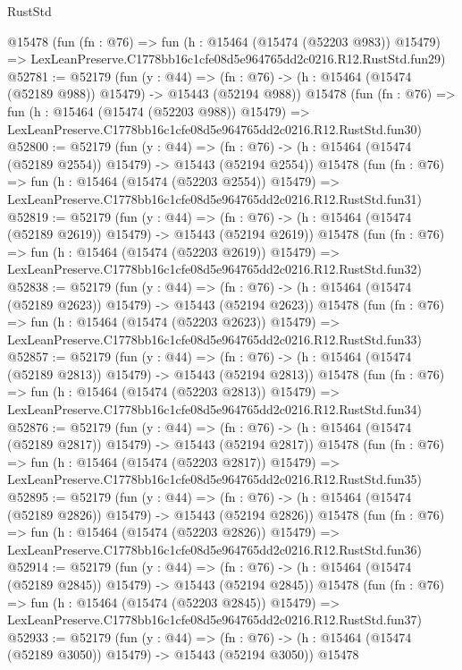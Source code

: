 \begin{lexlean}{RustStd}
\begin{coremodule}
    @15478
    (fun (fn : @76) =>
    fun (h : @15464 (@15474 (@52203 @983)) @15479) =>
    LexLeanPreserve.C1778bb16c1cfe08d5e964765dd2c0216.R12.RustStd.fun29)
@52781 := @52179
    (fun (y : @44) =>
    (fn : @76) -> (h : @15464 (@15474 (@52189 @988)) @15479) -> @15443 (@52194 @988))
    @15478
    (fun (fn : @76) =>
    fun (h : @15464 (@15474 (@52203 @988)) @15479) =>
    LexLeanPreserve.C1778bb16c1cfe08d5e964765dd2c0216.R12.RustStd.fun30)
@52800 := @52179
    (fun (y : @44) =>
    (fn : @76) -> (h : @15464 (@15474 (@52189 @2554)) @15479) -> @15443 (@52194 @2554))
    @15478
    (fun (fn : @76) =>
    fun (h : @15464 (@15474 (@52203 @2554)) @15479) =>
    LexLeanPreserve.C1778bb16c1cfe08d5e964765dd2c0216.R12.RustStd.fun31)
@52819 := @52179
    (fun (y : @44) =>
    (fn : @76) -> (h : @15464 (@15474 (@52189 @2619)) @15479) -> @15443 (@52194 @2619))
    @15478
    (fun (fn : @76) =>
    fun (h : @15464 (@15474 (@52203 @2619)) @15479) =>
    LexLeanPreserve.C1778bb16c1cfe08d5e964765dd2c0216.R12.RustStd.fun32)
@52838 := @52179
    (fun (y : @44) =>
    (fn : @76) -> (h : @15464 (@15474 (@52189 @2623)) @15479) -> @15443 (@52194 @2623))
    @15478
    (fun (fn : @76) =>
    fun (h : @15464 (@15474 (@52203 @2623)) @15479) =>
    LexLeanPreserve.C1778bb16c1cfe08d5e964765dd2c0216.R12.RustStd.fun33)
@52857 := @52179
    (fun (y : @44) =>
    (fn : @76) -> (h : @15464 (@15474 (@52189 @2813)) @15479) -> @15443 (@52194 @2813))
    @15478
    (fun (fn : @76) =>
    fun (h : @15464 (@15474 (@52203 @2813)) @15479) =>
    LexLeanPreserve.C1778bb16c1cfe08d5e964765dd2c0216.R12.RustStd.fun34)
@52876 := @52179
    (fun (y : @44) =>
    (fn : @76) -> (h : @15464 (@15474 (@52189 @2817)) @15479) -> @15443 (@52194 @2817))
    @15478
    (fun (fn : @76) =>
    fun (h : @15464 (@15474 (@52203 @2817)) @15479) =>
    LexLeanPreserve.C1778bb16c1cfe08d5e964765dd2c0216.R12.RustStd.fun35)
@52895 := @52179
    (fun (y : @44) =>
    (fn : @76) -> (h : @15464 (@15474 (@52189 @2826)) @15479) -> @15443 (@52194 @2826))
    @15478
    (fun (fn : @76) =>
    fun (h : @15464 (@15474 (@52203 @2826)) @15479) =>
    LexLeanPreserve.C1778bb16c1cfe08d5e964765dd2c0216.R12.RustStd.fun36)
@52914 := @52179
    (fun (y : @44) =>
    (fn : @76) -> (h : @15464 (@15474 (@52189 @2845)) @15479) -> @15443 (@52194 @2845))
    @15478
    (fun (fn : @76) =>
    fun (h : @15464 (@15474 (@52203 @2845)) @15479) =>
    LexLeanPreserve.C1778bb16c1cfe08d5e964765dd2c0216.R12.RustStd.fun37)
@52933 := @52179
    (fun (y : @44) =>
    (fn : @76) -> (h : @15464 (@15474 (@52189 @3050)) @15479) -> @15443 (@52194 @3050))
    @15478

\end{coremodule}
\end{lexlean}
